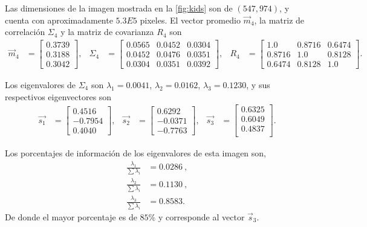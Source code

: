 Las dimensiones de la imagen mostrada en la \cref{fig:kids} son de $(547, 974)$, y cuenta con aproximadamente $5.3E5$ pixeles. El vector promedio $\vec{m}_4$, la matriz de correlación $\Sigma_4$ y la matriz de covarianza $R_4$ son
\begin{align*}
    \vec{m}_4 & =
    \begin{bmatrix}
        0.3739 \\
        0.3188 \\
        0.3042
    \end{bmatrix}, &
    \Sigma_4 & =
    \begin{bmatrix}
        0.0565 & 0.0452 & 0.0304 \\
        0.0452 & 0.0476 & 0.0351 \\
        0.0304 & 0.0351 & 0.0392
    \end{bmatrix}, &
    R_4 & = 
    \begin{bmatrix}
        1.0    & 0.8716 & 0.6474 \\
        0.8716 & 1.0    & 0.8128 \\
        0.6474 & 0.8128 & 1.0
    \end{bmatrix}.
\end{align*}

Los eigenvalores de $\Sigma_4$ son $\lambda_1 = 0.0041$, $\lambda_2 = 0.0162$, $\lambda_3 = 0.1230$, y sus respectivos eigenvectores son
\begin{align*}
    \vec{s_1} & =
    \begin{bmatrix}
        0.4516 \\
        -0.7954 \\
         0.4040
    \end{bmatrix}, &
    \vec{s_2} & = 
    \begin{bmatrix}
        0.6292 \\
        -0.0371 \\
        -0.7763
    \end{bmatrix}, &
    \vec{s_3} & =
    \begin{bmatrix}
        0.6325 \\
        0.6049 \\
        0.4837 \\
    \end{bmatrix}.
\end{align*}

Los porcentajes de información de los eigenvalores de esta imagen son,
\begin{align*}
    \frac{\lambda_1}{\sum \lambda_i} & = 0.0286\ , \\
    \frac{\lambda_2}{\sum \lambda_i} & = 0.1130\ , \\
    \frac{\lambda_3}{\sum \lambda_i} & = 0.8583 .
\end{align*}
De donde el mayor porcentaje es de $85\%$ y corresponde al vector $\vec{s}_3$.

